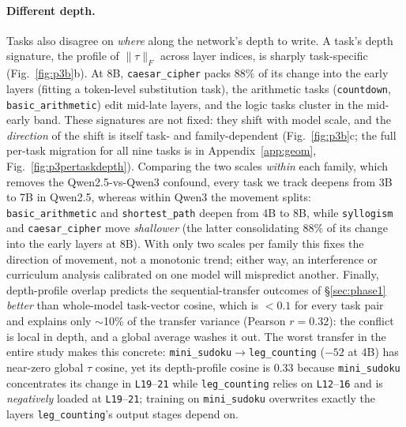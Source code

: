 \documentclass{article}
\newcommand{\tv}{\tau}
\begin{document}
\paragraph{Different depth.} Tasks also disagree on \emph{where} along the network's depth to write.
A task's depth signature, the profile of $\|\tv\|_F$ across layer indices, is sharply
task-specific (Fig.~\ref{fig:p3b}b). At 8B, \texttt{caesar\_cipher} packs $88\%$ of its change into
the early layers (fitting a token-level substitution task), the arithmetic tasks (\texttt{countdown},
\texttt{basic\_arithmetic}) edit mid-late layers, and the logic tasks cluster in the mid-early band.
These signatures are not fixed: they shift with model scale, and the \emph{direction} of the shift is
itself task- and family-dependent (Fig.~\ref{fig:p3b}c; the full per-task migration for all nine
tasks is in Appendix~\ref{app:geom}, Fig.~\ref{fig:p3pertaskdepth}). Comparing the two scales \emph{within} each
family, which removes the Qwen2.5-vs-Qwen3 confound, every task we track deepens from 3B to 7B in
Qwen2.5, whereas within Qwen3 the movement splits: \texttt{basic\_arithmetic} and
\texttt{shortest\_path} deepen from 4B to 8B, while \texttt{syllogism} and \texttt{caesar\_cipher}
move \emph{shallower} (the latter consolidating $88\%$ of its change into the early layers at 8B).
With only two scales per family this fixes the direction of movement, not a monotonic trend; either
way, an interference or curriculum analysis calibrated on one model will mispredict another.
Finally, depth-profile overlap predicts the sequential-transfer outcomes of \S\ref{sec:phase1}
\emph{better} than whole-model task-vector cosine, which is $<0.1$ for every task pair and explains
only $\sim$10\% of the transfer variance (Pearson $r{=}0.32$): the conflict is local in depth, and a
global average washes it out. The worst transfer in the entire study makes this concrete:
\texttt{mini\_sudoku}$\rightarrow$\texttt{leg\_counting} ($-52$ at 4B) has near-zero global $\tv$
cosine, yet its depth-profile cosine is $0.33$ because \texttt{mini\_sudoku} concentrates its change
in \texttt{L19}--\texttt{21} while \texttt{leg\_counting} relies on \texttt{L12}--\texttt{16} and is
\emph{negatively} loaded at \texttt{L19}--\texttt{21}; training on \texttt{mini\_sudoku} overwrites
exactly the layers \texttt{leg\_counting}'s output stages depend on.
\end{document}
